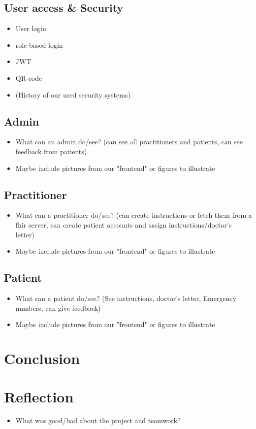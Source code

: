 \documentclass[]{report}
\begin{document}
\subsection{User access \& Security}
\begin{itemize}
    \item User login
    \item role based login
    \item JWT
    \item QR-code
    \item (History of our used security systems)
\end{itemize}

\subsection{Admin}
\begin{itemize}
    \item What can an admin do/see? (can see all practitioners and patients, can see feedback from patients)
    \item Maybe include pictures from our "frontend" or figures to illustrate
\end{itemize}

\subsection{Practitioner}
\begin{itemize}
    \item What can a practitioner do/see? (can create instructions or fetch them from a fhir server, can create patient accounts and assign instructions/doctor's letter)
    \item Maybe include pictures from our "frontend" or figures to illustrate
\end{itemize}

\subsection{Patient}
\begin{itemize}
    \item What can a patient do/see? (See instructions, doctor's letter, Emergency numbers, can give feedback)
    \item Maybe include pictures from our "frontend" or figures to illustrate
\end{itemize}

\section{Conclusion}

\section{Reflection}
\begin{itemize}
    \item What was good/bad about the project and teamwork?
\end{itemize}

% 
\end{document}
